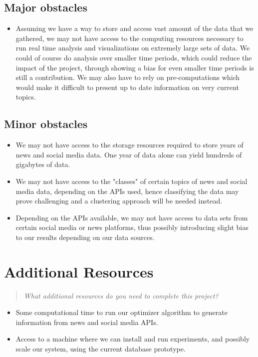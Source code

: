 \documentclass{proc}
\begin{document}
\subsection{Major obstacles} 

\begin{itemize}
    \item Assuming we have a way to store and access vast amount of the data that we gathered, we may not have access to the computing resources necessary to run real time analysis and visualizations
   on extremely large sets of data. We could of course do analysis over smaller time periods, which could reduce the impact of the project, through showing a bias for even smaller time periods is still a contribution. We may also
   have to rely on pre-computations which would make it difficult to present up to date information on very current topics.
\end{itemize}

\subsection{Minor obstacles}

\begin{itemize}
  \item We may not have access to the storage resources required to store years of news and social media data. One year of data alone can yield hundreds of gigabytes of data.
  \item We may not have access to  the "classes" of certain topics of news and social media data, depending on the APIs used, hence classifying the data may prove challenging and a clustering approach will be needed instead.
  \item Depending on the APIs available, we may not have access to data sets from certain social media or news platforms, thus possibly introducing slight bias to our results depending on our data sources.
\end{itemize}


\section{Additional Resources}
\begin{quote}
\emph{What additional resources do you need to complete this project?}
\end{quote}

\begin{itemize}
  \item Some computational time to run our optimizer algorithm to generate information from news and social media APIs.
  \item Access to a machine where we can install and run experiments, and possibly scale our system, using the current database prototype.
 \end{itemize}
 
\end{document}
